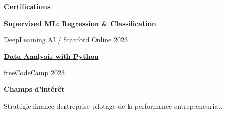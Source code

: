 \documentclass[10pt,a4paper]{article}
\newcommand{\smallsection}[2]{%
  \vspace{7pt}
  {\fontsize{8.9pt}{10.45pt}\selectfont\bfseries\color{accentdark}%
  {\scriptsize\color{accent}#1}\hspace{3.5pt}#2}\par
  \vspace{3pt}
}
\newcommand{\certitem}[2]{%
  \textbf{#1}\par
  {\fontsize{7.15pt}{8.1pt}\selectfont\color{muted}#2}\par
  \vspace{4pt}
}
\begin{document}
\begin{minipage}[t]{0.285\textwidth}
{\begin{minipage}[t]{0.91\linewidth}
  \smallsection{}{Certifications}
  \certitem{\href{https://www.coursera.org/account/accomplishments/verify/MWJS4Q3S2C3L}{Supervised ML: Regression \& Classification}}{DeepLearning.AI / Stanford Online \textbullet{} 2023}
  \certitem{\href{https://www.freecodecamp.org/certification/amiche/data-analysis-with-python-v7}{Data Analysis with Python}}{freeCodeCamp \textbullet{} 2023}


  \smallsection{}{Champs d'intérêt}
  {\color{muted}Stratégie \textbullet{} finance d\textquotesingle entreprise \textbullet{} pilotage de la performance \textbullet{} entrepreneuriat.}\par
  \vspace{3pt}
  \end{minipage}
}

\end{minipage}
\hfill
\usebox{\maincolumnbox}
\end{document}
